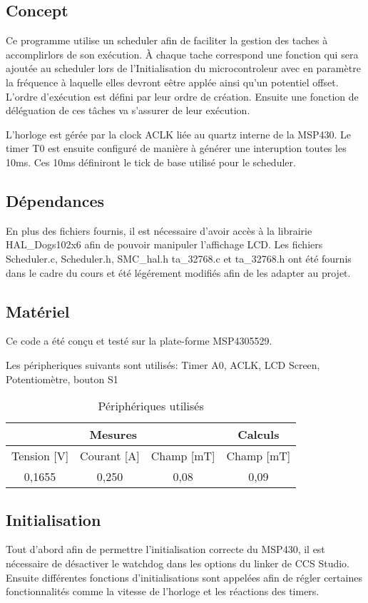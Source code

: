 \subsection{Concept}
Ce programme utilise un scheduler afin de faciliter la gestion des taches à accomplirlors de son exécution.
À chaque tache correspond une fonction qui sera ajoutée au scheduler lors de l'Initialisation du microcontroleur avec en paramètre la fréquence à laquelle elles devront eêtre applée ainsi qu'un potentiel offset. L'ordre d'exécution est défini par leur ordre de création. Ensuite une fonction de déléguation de ces tâches va s'assurer de leur exécution.

L'horloge est gérée par la clock ACLK liée au quartz interne de la MSP430. Le timer T0 est ensuite configuré de manière à générer une interuption toutes les 10ms. Ces 10ms définiront le tick de base utilisé pour le scheduler.

\subsection{Dépendances}
En plus des fichiers fournis, il est nécessaire d'avoir accès à la librairie HAL\_Dogs102x6 afin de pouvoir manipuler l'affichage LCD.
Les fichiers Scheduler.c, Scheduler.h, SMC\_hal.h ta\_32768.c et ta\_32768.h ont été fournis dans le cadre du cours et été légérement modifiés afin de les adapter au projet.

\subsection{Matériel}
Ce code a été conçu et testé sur la plate-forme MSP4305529.

Les péripheriques suivants sont utilisés:
Timer A0, ACLK, LCD Screen, Potentiomètre, bouton S1

\begin{table}[!h]
    \centering
    \caption{Périphériques utilisés}
    \begin{tabular}{|c|c|c||c|}
		\hline
		\multicolumn{3}{|c||}{Mesures} & Calculs\\
		\hline
	    Tension [V]	&Courant [A] &Champ [mT]& Champ [mT] \\
		\hline
		0,1655	&0,250	&0,08	&0,09\\
        \hline
    \end{tabular}
\end{table}

\subsection{Initialisation}
Tout d'abord afin de permettre l'initialisation correcte du MSP430, il est nécessaire de désactiver le watchdog dans les options du linker de CCS Studio.\\
Ensuite différentes fonctions d'initialisations sont appelées afin de régler certaines fonctionnalités comme la vitesse de l'horloge et les réactions des timers.

